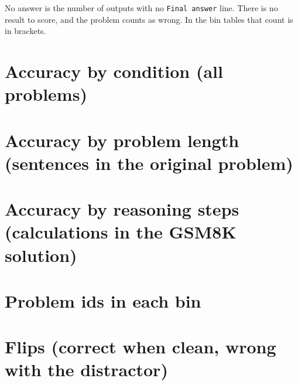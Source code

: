 \documentclass{article}
\begin{document}
No answer is the number of outputs with no \texttt{Final answer} line. There is no result to score, and the problem counts as wrong. In the bin tables that count is in brackets.

\section*{Accuracy by condition (all problems)}
\begin{center}
\resizebox{\textwidth}{!}{}
\end{center}
\section*{Accuracy by problem length (sentences in the original problem)}
\begin{center}
\resizebox{\textwidth}{!}{}
\end{center}
\section*{Accuracy by reasoning steps (calculations in the GSM8K solution)}
\begin{center}
\resizebox{\textwidth}{!}{}
\end{center}
\section*{Problem ids in each bin}
\begin{center}
\resizebox{\textwidth}{!}{}
\end{center}
\section*{Flips (correct when clean, wrong with the distractor)}
\begin{center}
\resizebox{\textwidth}{!}{}
\end{center}
\end{document}
